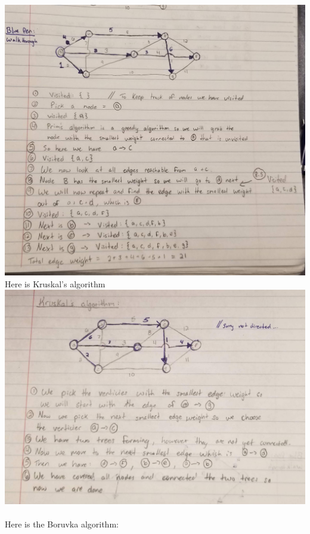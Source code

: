 \documentclass[12pt]{article}
\begin{document}
\begin{enumerate}
\includegraphics[scale=0.10, angle =90]{problem3pic4.png}\\
Here is Kruskal's algorithm\\
\includegraphics[scale=0.10]{problem3pic5.png}\\
\\
Here is the Boruvka algorithm:\\

\end{enumerate}
\end{document}
